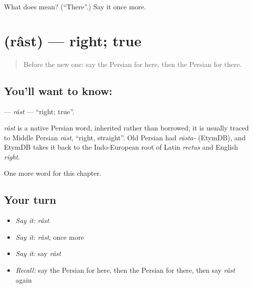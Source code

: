 \begin{tcolorbox}[breakable,colback=teal!4,colframe=teal!35!black,title={Before you move on}]
What does  mean? (\textquotedblleft{}There\textquotedblright{}.) Say it once more.
\end{tcolorbox}
\section[\texorpdfstring{\fa{راست} (râst)}{راست (râst)}]{ (râst) — right; true}

\label{lesson:FA-C69-rast}



\begin{quote}
Before the new one: say the Persian for here, then the Persian for there.
\end{quote}

\subsection*{You'll want to know: }
\textbf{} — \emph{râst} — \textquotedblleft{}right; true\textquotedblright{}.

\begin{cousinweb}
\emph{râst} is a native Persian word, inherited rather than borrowed; it is usually traced to Middle Persian \emph{rāst}, \textquotedblleft{}right, straight\textquotedblright{}. Old Persian had \emph{rāsta-} (EtymDB), and EtymDB takes it back to the Indo-European root of Latin \emph{rectus} and English \emph{right}.
\end{cousinweb}

\begin{grammarlens}[title={What you've built}]
One more word for this chapter.
\end{grammarlens}

\subsection*{Your turn}
\begin{itemize}
\raggedright
  \item \emph{Say it:} \emph{râst}
  \item \emph{Say it:} \emph{râst}, once more
  \item \emph{Say it:} say \emph{râst}
  \item \emph{Recall:} say the Persian for here, then the Persian for there, then say \emph{râst} again
\end{itemize}


